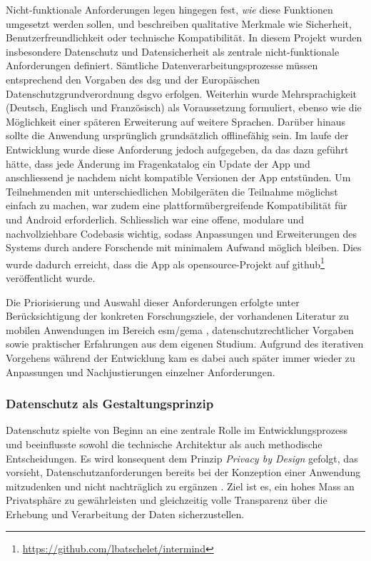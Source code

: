 Nicht-funktionale Anforderungen legen hingegen fest, \textit{wie} diese Funktionen umgesetzt werden sollen, und beschreiben qualitative Merkmale wie Sicherheit, Benutzerfreundlichkeit oder technische Kompatibilität. In diesem Projekt wurden insbesondere Datenschutz und Datensicherheit als zentrale nicht-funktionale Anforderungen definiert. Sämtliche Datenverarbeitungsprozesse müssen entsprechend den Vorgaben des \acrfull{dsg} und der Europäischen Datenschutzgrundverordnung \acrshort{dsgvo} erfolgen. Weiterhin wurde Mehrsprachigkeit (Deutsch, Englisch und Französisch) als Voraussetzung formuliert, ebenso wie die Möglichkeit einer späteren Erweiterung auf weitere Sprachen. Darüber hinaus sollte die Anwendung ursprünglich grundsätzlich offlinefähig sein. Im laufe der Entwicklung wurde diese Anforderung jedoch aufgegeben, da das dazu geführt hätte, dass jede Änderung im Fragenkatalog ein Update der App und anschliessend je nachdem nicht kompatible Versionen der App entstünden. Um Teilnehmenden mit unterschiedlichen Mobilgeräten die Teilnahme möglichst einfach zu machen, war zudem eine plattformübergreifende Kompatibilität für  und Android erforderlich. Schliesslich war eine offene, modulare und nachvollziehbare Codebasis wichtig, sodass Anpassungen und Erweiterungen des Systems durch andere Forschende mit minimalem Aufwand möglich bleiben. Dies wurde dadurch erreicht, dass die App als \gls{opensource}-Projekt auf \gls{github}\footnote{\href{https://github.com/lbatschelet/intermind}{https://github.com/lbatschelet/intermind}} veröffentlicht wurde.

Die Priorisierung und Auswahl dieser Anforderungen erfolgte unter Berücksichtigung der konkreten Forschungsziele, der vorhandenen Literatur zu mobilen Anwendungen im Bereich \gls{esm}/\gls{gema} \parencite[u.a.][]{chenPerceivedUrbanEnvironment2025, bakolisUrbanMindUsing2018, randallDevelopmentTrialMobile2013}, datenschutzrechtlicher Vorgaben sowie praktischer Erfahrungen aus dem eigenen Studium. Aufgrund des iterativen Vorgehens während der Entwicklung kam es dabei auch später immer wieder zu Anpassungen und Nachjustierungen einzelner Anforderungen.

\subsubsection{Datenschutz als Gestaltungsprinzip}

Datenschutz spielte von Beginn an eine zentrale Rolle im Entwicklungsprozess und beeinflusste sowohl die technische Architektur als auch methodische Entscheidungen. Es wird konsequent dem Prinzip \textit{Privacy by Design} gefolgt, das vorsieht, Datenschutzanforderungen bereits bei der Konzeption einer Anwendung mitzudenken und nicht nachträglich zu ergänzen \parencite{cavoukianPrivacyDesign72009}. Ziel ist es, ein hohes Mass an Privatsphäre zu gewährleisten und gleichzeitig volle Transparenz über die Erhebung und Verarbeitung der Daten sicherzustellen.

